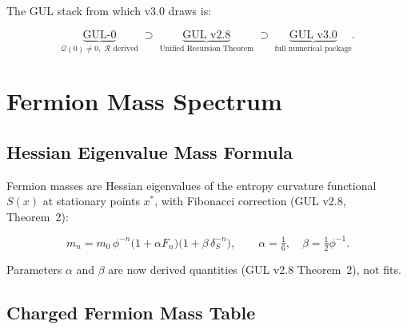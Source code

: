 \documentclass[11pt]{article}
\begin{document}
The GUL stack from which v3.0 draws is:

\begin{equation}
  \underbrace{\text{GUL-0}}_{\mathcal{Q}(0)\neq0,\;\mathcal{R}\text{ derived}}
  \;\supset\;
  \underbrace{\text{GUL v2.8}}_{\text{Unified Recursion Theorem}}
  \;\supset\;
  \underbrace{\text{GUL v3.0}}_{\text{full numerical package}}.
\end{equation}

\section{Fermion Mass Spectrum}
\label{sec:fermions}

\subsection{Hessian Eigenvalue Mass Formula}

Fermion masses are Hessian eigenvalues of the entropy curvature
functional $S(x)$ at stationary points $x^*$, with Fibonacci
correction (GUL v2.8, Theorem~2):

\begin{equation}
  m_n = m_0\,\phi^{-n}
        \bigl(1 + \alpha F_n\bigr)
        \bigl(1 + \beta\,\delta_S^{-n}\bigr),
  \qquad
  \alpha = \tfrac{1}{6},\quad
  \beta  = \tfrac{1}{2}\phi^{-1}.
\end{equation}

Parameters $\alpha$ and $\beta$ are now derived quantities (GUL
v2.8 Theorem~2), not fits.

\subsection{Charged Fermion Mass Table}
\end{document}
